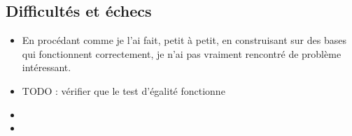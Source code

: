 \documentclass{article}
\begin{document}
\subsection{Difficultés et échecs}
\begin{itemize}
\item En procédant comme je l'ai fait, petit à petit, en construisant sur des bases qui fonctionnent correctement, je n'ai pas vraiment rencontré de problème intéressant.
\item TODO : vérifier que le test d'égalité fonctionne 
\item 
\item 
\end{itemize}
\end{document}
